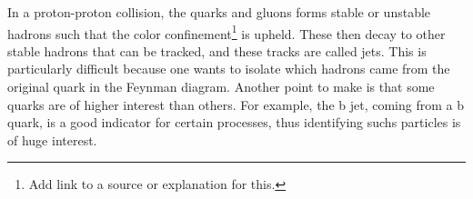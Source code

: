 In a proton-proton collision, the quarks and gluons forms stable or unstable hadrons such that the color confinement\footnote{Add link to a source or explanation for this.} is upheld. These then 
decay to other stable hadrons that can be tracked, and these tracks are called jets. This is particularly difficult because one wants to isolate which hadrons came from  the original quark in the 
Feynman diagram. Another point to make is that some quarks are of higher interest than others. For example, the b jet, coming from a b quark, is a good indicator for certain processes, 
thus identifying suchs particles is of huge interest. 